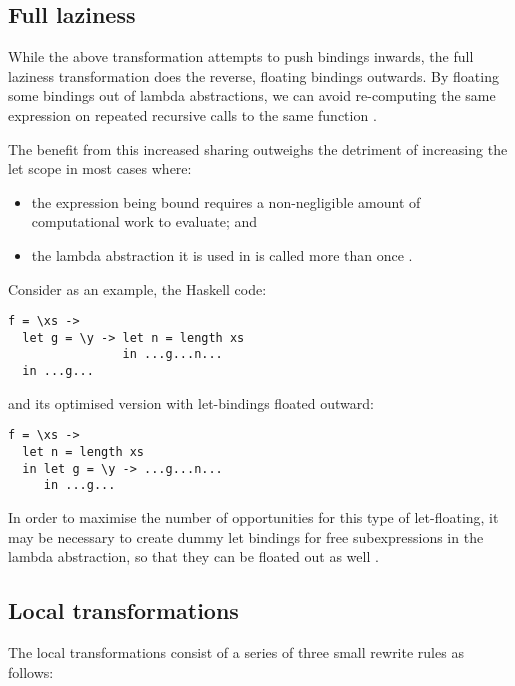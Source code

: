 \subsection*{Full laziness}

While the above transformation attempts to push bindings inwards, the full laziness transformation does the reverse, floating bindings outwards. By floating some bindings out of lambda abstractions, we can avoid re-computing the same expression on repeated recursive calls to the same function \citep{jones1996}.

The benefit from this increased sharing outweighs the detriment of increasing the let scope in most cases where:
\begin{itemize}
\item the expression being bound requires a non-negligible amount of computational work to evaluate; and
\item the lambda abstraction it is used in is called more than once \citep{jones1996}.
\end{itemize}

Consider as an example, the Haskell code\citep{jones1996}:
\begin{lstlisting}
f = \xs ->
  let g = \y -> let n = length xs
                in ...g...n...
  in ...g...
\end{lstlisting}

and its optimised version with let-bindings floated outward:
\begin{lstlisting}
f = \xs ->
  let n = length xs
  in let g = \y -> ...g...n...
     in ...g...
\end{lstlisting}

In order to maximise the number of opportunities for this type of let-floating, it may be necessary to create dummy let bindings for free subexpressions in the lambda abstraction, so that they can be floated out as well \citep{jones1996}.

\subsection*{Local transformations}

The local transformations consist of a series of three small rewrite rules as follows:

